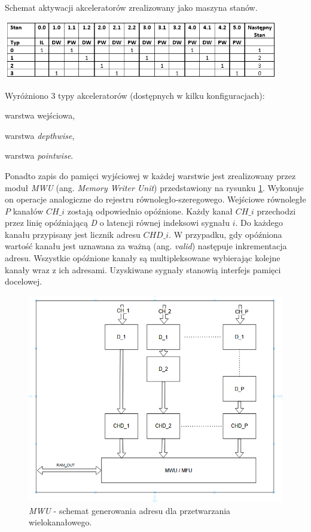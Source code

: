 \begin{table}
    \centering
    \caption{Schemat aktywacji akceleratorów zrealizowany jako maszyna stanów.}
    \label{tab:LNACC}
    \includegraphics[width=0.9\textwidth]{images/acc_activ.png}
\end{table}
Wyróżniono 3 typy akceleratorów (dostępnych w kilku konfiguracjach):
\begin{description}
\item warstwa wejściowa,
\item warstwa \emph{depthwise},
\item warstwa \emph{pointwise}.
\end{description}

Ponadto zapis do pamięci wyjściowej w każdej warstwie jest zrealizowany przez moduł \emph{MWU} (ang. \emph{Memory Writer Unit}) przedstawiony na rysunku \ref{fig:mwu}.
Wykonuje on operacje analogiczne do rejestru równoległo-szeregowego.
Wejściowe równoległe $P$ kanałów $CH\_i$ zostają odpowiednio opóźnione. 
Każdy kanał $CH\_{i}$ przechodzi przez linię opóźniającą \emph{D} o latencji równej indeksowi sygnału $i$.
Do każdego kanału przypisany jest licznik adresu $CHD\_i$.
W przypadku, gdy opóźniona wartość kanału jest uznawana za ważną (ang. \emph{valid}) następuje inkrementacja adresu.
Wszystkie opóźnione kanały są multipleksowane wybierając kolejne kanały wraz z ich adresami.
Uzyskiwane sygnały stanowią interfejs pamięci docelowej.

\begin{figure}
    \centering
    \includegraphics[width=0.8\linewidth]{images/MWU.png}
    \caption{\emph{MWU} - schemat generowania adresu dla przetwarzania wielokanałowego.}
    \label{fig:mwu}
\end{figure}


